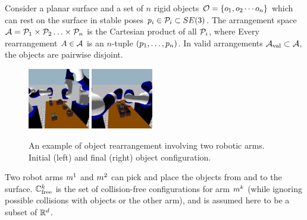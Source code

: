 Consider a planar surface and a set of $n$ rigid objects $ \mathcal{O}=\{ o_1, o_2 \cdots o_n\}$  which can rest on the surface in stable poses $p_i \in \mathcal{P}_i \subset SE(3)$. The arrangement space $ \mathcal{A} = \mathcal{P}_1 \times \mathcal{P}_2 \ldots \times \mathcal{P}_n $ is the Cartesian product of all $\mathcal{P}_i$, where Every rearrangement $A \in \mathcal{A}$ is an $n$-tuple $(p_1, \ldots, p_n)$. In valid arrangements $ \mathcal{A}_{\rm val} \subset \mathcal{A}$, the objects are pairwise disjoint.


\begin{figure}[h]
	\centering
	\includegraphics[width=0.24\textwidth,trim={10cm 3cm 8cm 12cm},clip]{figures/rearrangement_start}
	\includegraphics[width=0.24\textwidth,trim={10cm 3cm 8cm 12cm},clip]{figures/rearrangement_end}
	\caption{An example of object rearrangement involving two robotic arms. Initial (left) and final (right) object configuration.}
	\label{fig:rearrangement}
\end{figure}
Two robot arms $m^1$ and $m^2$ can 
pick and place the objects from and to the surface.
$\mathbb{C}_{{\rm free}}^k$ is the set of collision-free configurations for arm $m^k$ (while ignoring possible collisions with  objects or the other arm), and is assumed here to be a subset of $\mathbb{R}^d $.
